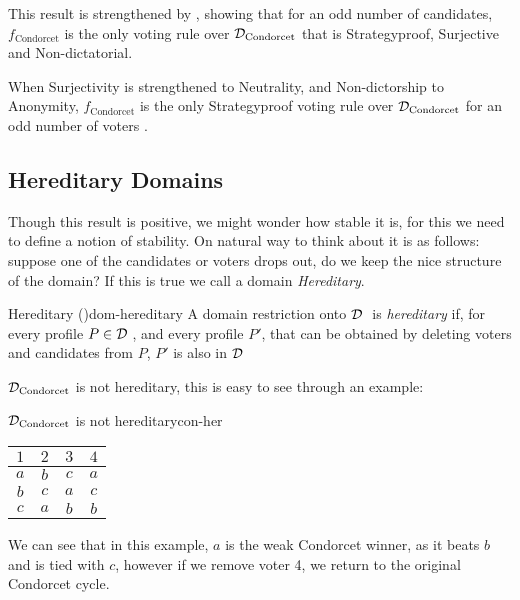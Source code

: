 This result is strengthened by
\citet{campbellNonmonotonicityDoesNot2002,campbellCorrectionStrategyproofnessCharacterization2016},
showing that for an odd number of candidates, \(f_{\text{Condorcet}}\) is the
only voting rule over \(\mathcal{D}_{\textnormal{Condorcet}}\) that is Strategyproof, Surjective
and Non-dictatorial.

When Surjectivity is strengthened to Neutrality, and Non-dictorship to
Anonymity, \linebreak \(f_{\text{Condorcet}}\) is the only Strategyproof voting
rule over \(\mathcal{D}_{\textnormal{Condorcet}}\) for an odd number of voters
\cite{campbellAnonymousNeutralStrategyproof2015}.

\subsection{Hereditary Domains}

Though this result is positive, we might wonder how stable it is, for this we need to define a notion of stability. On natural way to think about it is as follows: suppose one of the candidates or voters drops out, do we keep the nice structure of the domain? If this is true we call a domain \emph{Hereditary}.

\begin{definition}{Hereditary \textnormal{(\citet{elkindPreferenceRestrictionsComputational2022})}}{dom-hereditary}
	A domain restriction onto $\mathcal{D}_{\textnormal{ }}$ is \emph{hereditary} if, for every profile $P \in \mathcal{D}_{\textnormal{ }}$, and every profile $P'$, that can be obtained by deleting voters and candidates from $P$, $P'$ is also in $\mathcal{D}_{\textnormal{ }}$
\end{definition}

$\mathcal{D}_{\textnormal{Condorcet}}$ is not hereditary, this is easy to see through an example:

\begin{example}{$\mathcal{D}_{\textnormal{Condorcet}}$ is not hereditary}{con-her}
	\begin{minipage}{0.25\linewidth}
		\begin{tabular}{cccc}
			\toprule
			$1$ & $2$ & $3$ & $4$ \\
			\midrule
			$a$ & $b$ & $c$ & $a$ \\
			$b$ & $c$ & $a$ & $c$ \\
			$c$ & $a$ & $b$ & $b$ \\
			\bottomrule
		\end{tabular}
	\end{minipage}
	\begin{minipage}[b]{0.70\linewidth}
		We can see that in this example, $a$ is the weak Condorcet winner, as it beats $b$ and is tied with $c$, however if we remove voter 4, we return to the original Condorcet cycle.
	\end{minipage}
\end{example}

